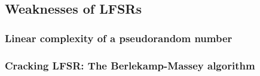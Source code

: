 \subsection{Weaknesses of LFSRs}

\subsubsection{Linear complexity of a pseudorandom number}

\subsubsection{Cracking LFSR: The Berlekamp-Massey algorithm}